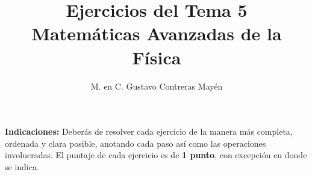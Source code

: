 
\title{Ejercicios del Tema 5 \\[0.3em]  \large{Matemáticas Avanzadas de la Física}\vspace{-3ex}}
\author{M. en C. Gustavo Contreras Mayén}
\date{ }

\vspace{-4cm}
\maketitle
\fontsize{14}{14}\selectfont

\textbf{Indicaciones: } Deberás de resolver cada ejercicio de la manera más completa, ordenada y clara posible, anotando cada paso así como las operaciones involucradas. El puntaje de cada ejercicio es de \textbf{1 punto}, con excepción en donde se indica.

